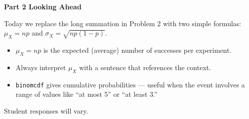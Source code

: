 \documentclass[10pt]{article}
\begin{document}
\vspace{0.2in}

{\large\bfseries\color{navy} Part 2 \quad Looking Ahead}

\vspace{0.12in}

\noindent Today we replace the long summation in Problem 2 with two simple formulas:
$\mu_X = np$ and $\sigma_X = \sqrt{np(1-p)}$.

\vspace{0.14in}

\begin{tcolorbox}[colback=greenbg, colframe=greenacc, boxrule=0.8pt, arc=2mm,
    left=4mm, right=4mm, top=3mm, bottom=3mm]
    \small
    \begin{itemize}[leftmargin=1.3em, itemsep=8pt]
  \item $\mu_X = np$ is the expected (average) number of successes per experiment.
  \item Always interpret $\mu_X$ with a sentence that references the context.
  \item \texttt{binomcdf} gives cumulative probabilities --- useful when the event
        involves a range of values like ``at most 5'' or ``at least 3.''
    \end{itemize}
\end{tcolorbox}

\vspace{0.18in}

\noindent\textcolor{slate}{\small Student responses will vary.}
\end{document}
